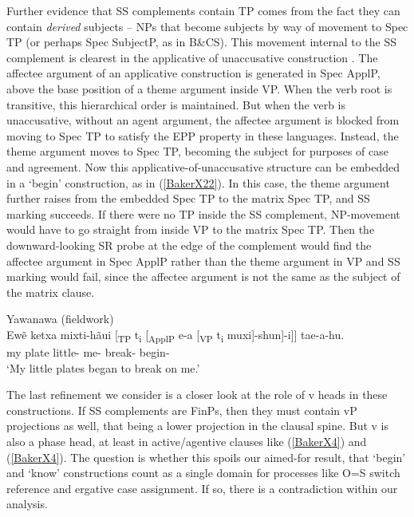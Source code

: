 \documentclass[output=paper]{langscibook}
\begin{document}
Further evidence that SS complements contain TP comes from the fact they can contain \textit{derived} subjects – NPs that become subjects by way of movement to Spec TP (or perhaps Spec SubjectP, as in B\&CS). This movement internal to the SS complement is clearest in the applicative of unaccusative construction \citep[see][]{baker2014dependent}. The affectee argument of an applicative construction is generated in Spec ApplP, above the base position of a theme argument inside VP. When the verb root is transitive, this hierarchical order is maintained. But when the verb is unaccusative, without an agent argument, the affectee argument is blocked from moving to Spec TP to satisfy the EPP property in these languages. Instead, the theme argument moves to Spec TP, becoming the subject for purposes of case and agreement. Now this applicative-of-unaccusative structure can be embedded in a `begin’ construction, as in (\ref{BakerX22}). In this case, the theme argument further raises from the embedded Spec TP to the matrix Spec TP, and SS marking succeeds. If there were no TP inside the SS complement, NP-movement would have to go straight from inside VP to the matrix Spec TP. Then the downward-looking SR probe at the edge of the complement would find the affectee argument in Spec ApplP rather than the theme argument in VP and SS marking would fail, since the affectee argument is not the same as the subject of the matrix clause.

\begin{exe}
    \ex Yawanawa (fieldwork) \label{BakerX22}\\
	\gll Ewẽ ketxa {mixti-hãui [\textsubscript{TP} t\textsubscript{i}} {[\textsubscript{ApplP} e-a} {[\textsubscript{VP} t\textsubscript{i} muxi]-shun]-i]}] tae-a-hu.\\
    my plate little- me- break- begin-\\
	\glt `My little plates began to break on me.'
\end{exe}

The last refinement we consider is a closer look at the role of v heads in these constructions. If SS complements are FinPs, then they must contain vP projections as well, that being a lower projection in the clausal spine. But v is also a phase head, at least in active/agentive clauses like (\ref{BakerX4}) and (\ref{BakerX4}). The question is whether this spoils our aimed-for result, that ‘begin’ and ‘know’ constructions count as a single domain for processes like O=S switch reference and ergative case assignment. If so, there is a contradiction within our analysis.
\end{document}

